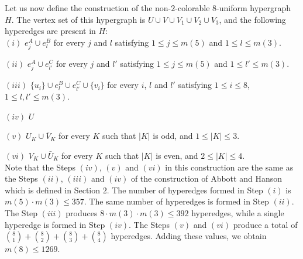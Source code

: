 \documentclass[11pt]{article}
\begin{document}
Let us now define the construction of the non-$2$-colorable $8$-uniform hypergraph $H$. The vertex set of this hypergraph is $U \cup V \cup V_1 \cup V_2 \cup V_3$, and the following hyperedges are present in $H$:\\

$(i)$ $ e^A_j \cup e^B_l $ for every $j$ and $l$ satisfying $1 \leq j \leq m(5)$ and $1 \leq l \leq m(3)$.

$(ii)$ $ e^A_j \cup e^C_{l'} $ for every $j$ and $l'$ satisfying $1 \leq j \leq m(5)$ and $1 \leq l' \leq m(3)$.

$(iii)$ $ \{u_i\} \cup e^B_l \cup e^C_{l'} \cup \{v_i\} $ for every $i$, $l$ and $l'$ satisfying $1 \leq i \leq 8$, $1 \leq l, l' \leq m(3)$.

$(iv)$ $U$

$(v)$ $U_K \cup {\bar{V}}_K$ for every $K$ such that $|K|$ is odd, and $1 \leq |K| \leq 3$.

$(vi)$ $V_K \cup {\bar{U}}_K$ for every $K$ such that $|K|$ is even, and $2 \leq |K| \leq 4$. \\

Note that the Steps $(iv)$, $(v)$ and $(vi)$ in this construction are the same as the Steps $(ii)$, $(iii)$ and $(iv)$ of the construction of Abbott and Hanson \cite{Abbott} which is defined in Section $2$. The number of hyperedges formed in Step $(i)$ is $m(5) \cdot m(3) \leq 357$. The same number of hyperedges is formed in Step $(ii)$. The Step $(iii)$ produces $8 \cdot m(3) \cdot m(3) \leq 392$ hyperedges, while a single hyperedge is formed in Step $(iv)$. The Steps $(v)$ and $(vi)$ produce a total of $\binom{8}{1} + \binom{8}{2} + \binom{8}{3} + \binom{8}{4}$ hyperedges. Adding these values, we obtain $m(8) \leq 1269$.\\
\end{document}
